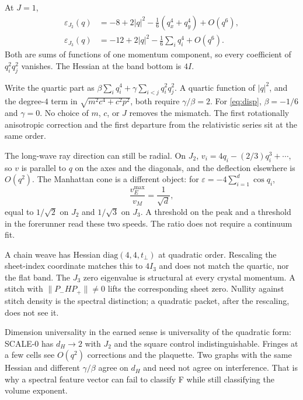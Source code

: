 At \(J=1\),
\begin{align}
\label{eq:disp}
\varepsilon_{J_2}(q)
&=-8+2|q|^2-\tfrac16(q_x^4+q_y^4)+O(q^6),\\
\varepsilon_{J_3}(q)
&=-12+2|q|^2-\tfrac16\sum_i q_i^4+O(q^6).
\end{align}
Both are sums of functions of one momentum component, so every
coefficient of \(q_i^2 q_j^2\) vanishes.
The Hessian at the band bottom is \(4I\).

\begin{theorem}
\label{thm:ratio}
Write the quartic part as
\(\beta\sum_i q_i^4+\gamma\sum_{i<j}q_i^2 q_j^2\).
A quartic function of \(|q|^2\), and the degree-\(4\) term in
\(\sqrt{m^2c^4+c^2p^2}\), both require \(\gamma/\beta=2\).
For \eqref{eq:disp}, \(\beta=-1/6\) and \(\gamma=0\).
No choice of \(m\), \(c\), or \(J\) removes the mismatch.
The first rotationally anisotropic correction and the first departure from
the relativistic series sit at the same order.
\end{theorem}

The long-wave ray direction can still be radial.
On \(J_2\),
\(v_i=4q_i-(2/3)q_i^3+\cdots\), so \(v\) is parallel to \(q\) on the axes
and the diagonals, and the deflection elsewhere is \(O(q^2)\).
The Manhattan cone is a different object: for
\(\varepsilon=-4\sum_{i=1}^d\cos q_i\),
\[
\frac{v_E^{\max}}{v_M}=\frac{1}{\sqrt{d}},
\]
equal to \(1/\sqrt{2}\) on \(J_2\) and \(1/\sqrt{3}\) on \(J_3\).
A threshold on the peak and a threshold in the forerunner read these two
speeds. The ratio does not require a continuum fit.

A chain weave has Hessian \(\mathrm{diag}(4,4,t_\perp)\) at quadratic order.
Rescaling the sheet-index coordinate matches this to \(4I_3\) and does not
match the quartic, nor the flat band.
The \(J_3\) zero eigenvalue is structural at every crystal momentum.
A stitch with \(\|P_- H P_+\|\neq 0\) lifts the corresponding sheet zero.
Nullity against stitch density is the spectral distinction;
a quadratic packet, after the rescaling, does not see it.

Dimension universality in the earned sense is universality of the
quadratic form: SCALE-0 has \(d_H\to 2\) with \(J_2\) and the square control
indistinguishable.
Fringes at a few cells see \(O(q^2)\) corrections and the plaquette.
Two graphs with the same Hessian and different \(\gamma/\beta\)
agree on \(d_H\) and need not agree on interference.
That is why a spectral feature vector can fail to classify F
while still classifying the volume exponent.

